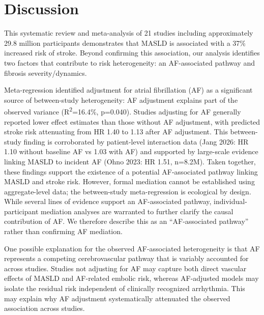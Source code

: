 \documentclass[12pt,a4paper]{article}
\begin{document}
\section{Discussion}

This systematic review and meta-analysis of 21 studies including approximately 29.8 million participants demonstrates that MASLD is associated with a 37\% increased risk of stroke. Beyond confirming this association, our analysis identifies two factors that contribute to risk heterogeneity: an AF-associated pathway and fibrosis severity/dynamics.

Meta-regression identified adjustment for atrial fibrillation (AF) as a significant source of between-study heterogeneity: AF adjustment explains part of the observed variance (R\textsuperscript{2}=16.4\%, p=0.040). Studies adjusting for AF generally reported lower effect estimates than those without AF adjustment, with predicted stroke risk attenuating from HR 1.40 to 1.13 after AF adjustment. This between-study finding is corroborated by patient-level interaction data (Jang 2026: HR 1.10 without baseline AF vs 1.03 with AF) and supported by large-scale evidence linking MASLD to incident AF (Ohno 2023: HR 1.51, n=8.2M). Taken together, these findings support the existence of a potential AF-associated pathway linking MASLD and stroke risk. However, formal mediation cannot be established using aggregate-level data; the between-study meta-regression is ecological by design. While several lines of evidence support an AF-associated pathway, individual-participant mediation analyses are warranted to further clarify the causal contribution of AF. We therefore describe this as an ``AF-associated pathway'' rather than confirming AF mediation.

One possible explanation for the observed AF-associated heterogeneity is that AF represents a competing cerebrovascular pathway that is variably accounted for across studies. Studies not adjusting for AF may capture both direct vascular effects of MASLD and AF-related embolic risk, whereas AF-adjusted models may isolate the residual risk independent of clinically recognized arrhythmia. This may explain why AF adjustment systematically attenuated the observed association across studies.
\end{document}
